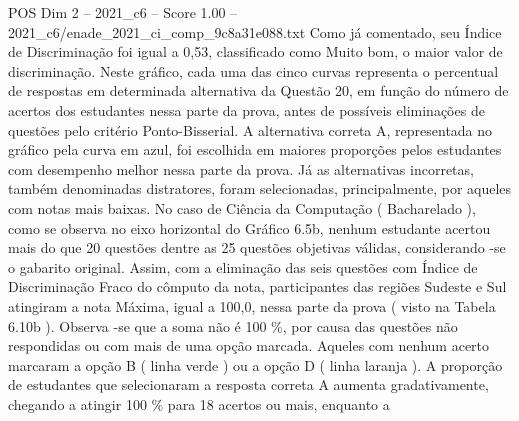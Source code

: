 \begin{textsample}{POS Dim 2 – 2021\_c6 – Score 1.00 – 2021\_c6/enade\_2021\_ci\_comp\_9c8a31e088.txt}
Como já comentado, seu Índice de Discriminação foi igual a 0,53, classificado como Muito bom, o maior valor de discriminação.
Neste gráfico, cada uma das cinco curvas representa o percentual de respostas em determinada alternativa da Questão 20, em função do número de acertos dos estudantes nessa parte da prova, antes de possíveis eliminações de questões pelo critério Ponto-Bisserial.
A alternativa correta A, representada no gráfico pela curva em azul, foi escolhida em maiores proporções pelos estudantes com desempenho melhor nessa parte da prova.
Já as alternativas incorretas, também denominadas distratores, foram selecionadas, principalmente, por aqueles com notas mais baixas.
No caso de Ciência da Computação ( Bacharelado ), como se observa no eixo horizontal do Gráfico 6.5b, nenhum estudante acertou mais do que 20 questões dentre as 25 questões objetivas válidas, considerando -se o gabarito original.
Assim, com a eliminação das seis questões com Índice de Discriminação Fraco do cômputo da nota, participantes das regiões Sudeste e Sul atingiram a nota Máxima, igual a 100,0, nessa parte da prova ( visto na Tabela 6.10b ).
Observa -se que a soma não é 100 \%, por causa das questões não respondidas ou com mais de uma opção marcada.
Aqueles com nenhum acerto marcaram a opção B ( linha verde ) ou a opção D ( linha laranja ).
A proporção de estudantes que selecionaram a resposta correta A aumenta gradativamente, chegando a atingir 100 \% para 18 acertos ou mais, enquanto a

\end{textsample}
